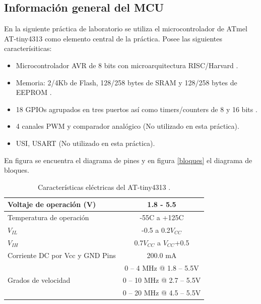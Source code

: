 \subsection{Información general del MCU}
En la siguiente práctica de laboratorio se utiliza el microcontrolador de ATmel AT-tiny4313 como elemento central de la práctica. Posee las siguientes caracterísiticas:
\begin{itemize}
    \item Microcontrolador AVR de 8 bits con microarquitectura RISC/Harvard \cite{presentacion}.
    \item Memoria: 2/4Kb de Flash, 128/258 bytes de SRAM y 128/258 bytes de EEPROM \cite{presentacion}.
    \item 18 GPIOs agrupados en tres puertos así como timers/counters de 8 y 16 bits \cite{presentacion}.
    \item 4 canales PWM y comparador analógico \cite{presentacion}  (No utilizado en esta práctica).
    \item USI, USART \cite{presentacion}  (No utilizado en esta práctica).
    
\end{itemize}

En figura \label{pines} se encuentra el diagrama de pines y en figura \ref{bloques} el diagrama de bloques. 


\begin{table}[H]
\centering
\begin{tabular}{|l|c|}
\hline
Voltaje de operación (V)             & 1.8 - 5.5                                       \\ \hline
Temperatura de operación                & -55C a +125C                                    \\ \hline
$V_{IL}$                                 & -0.5 a 0.2$V_{CC}$                              \\ \hline
$V_{IH}$                                 & 0.7$V_{CC}$ a $V_{CC}$+0.5                                  \\ \hline
Corriente DC por Vcc y GND Pins      & 200.0 mA                                        \\ \hline
\multirow{3}{*}{Grados de velocidad} & 0 – 4 MHz @ 1.8 – 5.5V                          \\ \cline{2-2} 
                                     & 0 – 10 MHz @ 2.7 – 5.5V                         \\ \cline{2-2} 
                                     & 0 – 20 MHz @ 4.5 – 5.5V                         \\ \hline
\end{tabular}
\label{power}
\caption{Características eléctricas del AT-tiny4313 \cite{datasheet}.}
\end{table}

